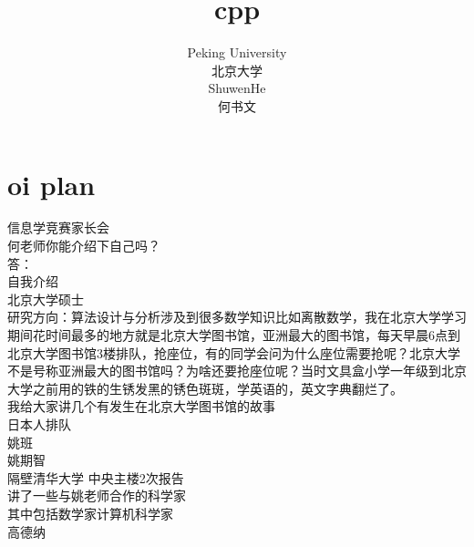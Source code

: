 \documentclass[12pt,twiside,a4paper]{ctexbook}
\numberwithin{chapter}{part}
\begin{document}

\author
{
Peking University\\
北京大学\\
ShuwenHe\\
何书文
}

\title{cpp}
\maketitle
\tableofcontents
\pagestyle{fancy}


\chapter{oi plan}
信息学竞赛家长会\\
何老师你能介绍下自己吗？\\
答：\\
自我介绍\\
北京大学硕士\\
研究方向：算法设计与分析涉及到很多数学知识比如离散数学，我在北京大学学习期间花时间最多的地方就是北京大学图书馆，亚洲最大的图书馆，每天早晨6点到北京大学图书馆3楼排队，抢座位，有的同学会问为什么座位需要抢呢？北京大学不是号称亚洲最大的图书馆吗？为啥还要抢座位呢？当时文具盒小学一年级到北京大学之前用的铁的生锈发黑的锈色斑斑，学英语的，英文字典翻烂了。\\
我给大家讲几个有发生在北京大学图书馆的故事\\
日本人排队\\

姚班\\
姚期智\\
隔壁清华大学 中央主楼2次报告\\
讲了一些与姚老师合作的科学家\\
其中包括数学家计算机科学家\\
高德纳
\end{document}
